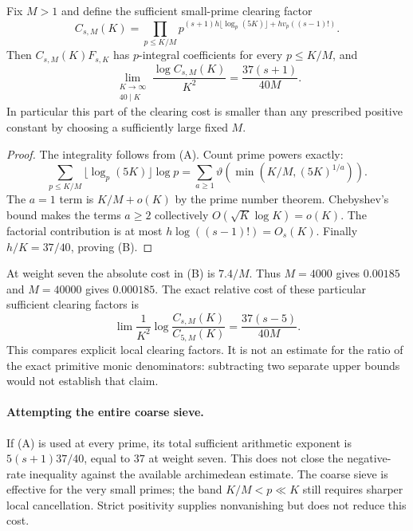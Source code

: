 \begin{proposition}\label{prop:small-prime-budget}
Fix $M>1$ and define the sufficient small-prime clearing factor
\[
 C_{s,M}(K)=\prod_{p\le K/M}
 p^{(s+1)h\lfloor\log_p(5K)\rfloor+hv_p((s-1)!)}.
\]
Then $C_{s,M}(K)F_{s,K}$ has $p$-integral coefficients for every
$p\le K/M$, and
\[
 \lim_{\substack{K\to\infty\\40\mid K}}
 \frac{\log C_{s,M}(K)}{K^2}
 =\frac{37(s+1)}{40M}.                                    \tag{B}
\]
In particular this part of the clearing cost is smaller than any
prescribed positive constant by choosing a sufficiently large fixed $M$.
\end{proposition}
\begin{proof}
The integrality follows from (A). Count prime powers exactly:
\[
 \sum_{p\le K/M}\lfloor\log_p(5K)\rfloor\log p
 =\sum_{a\ge1}\vartheta\left(\min(K/M,(5K)^{1/a})\right).
\]
The $a=1$ term is $K/M+o(K)$ by the prime number theorem.
Chebyshev's bound makes the terms $a\ge2$ collectively
$O(\sqrt K\log K)=o(K)$. The factorial contribution is at most
$h\log((s-1)!)=O_s(K)$. Finally $h/K=37/40$, proving (B).
\end{proof}

At weight seven the absolute cost in (B) is $7.4/M$. Thus $M=4000$
gives $0.00185$ and $M=40000$ gives $0.000185$.
The exact relative cost of these particular sufficient clearing factors is
\[
 \lim\frac1{K^2}\log\frac{C_{s,M}(K)}{C_{5,M}(K)}
 =\frac{37(s-5)}{40M}.                                    \tag{C}
\]
This compares explicit local clearing factors. It is not an estimate
for the ratio of the exact primitive monic denominators: subtracting
two separate upper bounds would not establish that claim.

\paragraph{Attempting the entire coarse sieve.}
If (A) is used at every prime, its total sufficient arithmetic exponent
is $5(s+1)37/40$, equal to $37$ at weight seven. This does not close
the negative-rate inequality against the available archimedean estimate.
The coarse sieve is effective for the very small primes; the band
$K/M<p\ll K$ still requires sharper local cancellation.
Strict positivity supplies nonvanishing but does not reduce this cost.

